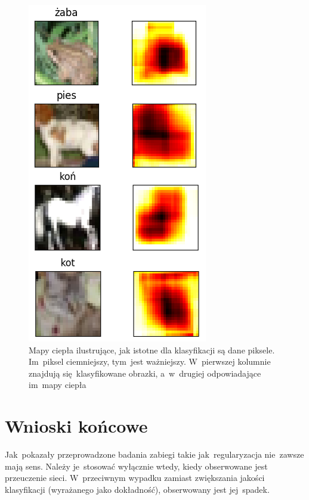\begin{figure}[H]
	\centering
	\includegraphics[width=0.75\linewidth]{img/heatmap.png}
	\caption{Mapy ciepła ilustrujące, jak istotne dla klasyfikacji są dane piksele. Im~piksel ciemniejszy, tym~jest
	ważniejszy. W~pierwszej kolumnie znajdują się~klasyfikowane obrazki, a~w~drugiej odpowiadające im~mapy ciepła}
	\label{rys:badanie-3}
\end{figure}

\section{Wnioski końcowe}
Jak~pokazały przeprowadzone badania zabiegi takie jak~regularyzacja nie~zawsze mają sens. Należy je~stosować wyłącznie
wtedy, kiedy obserwowane jest przeuczenie sieci. W~przeciwnym wypadku zamiast zwiększania jakości klasyfikacji
(wyrażanego jako dokładność), obserwowany jest jej~spadek.

